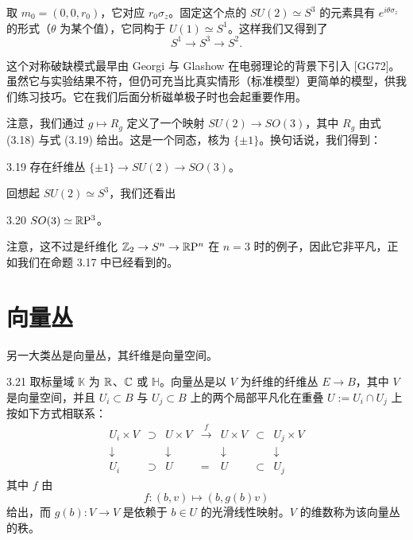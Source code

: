 取 $m_0=(0,0,r_0)$，它对应 $r_0\sigma_z$。固定这个点的 $SU(2)\simeq S^3$ 的元素具有 $e^{i\theta\sigma_z}$ 的形式（$\theta$ 为某个值），它同构于 $U(1)\simeq S^1$。这样我们又得到了
\[
S^1\to S^3\to S^2.
\tag{3.20}
\]

这个对称破缺模式最早由 Georgi 与 Glashow 在电弱理论的背景下引入 [GG72]。虽然它与实验结果不符，但仍可充当比真实情形（标准模型）更简单的模型，供我们练习技巧。它在我们后面分析磁单极子时也会起重要作用。

注意，我们通过 $g\mapsto R_g$ 定义了一个映射 $SU(2)\to SO(3)$，其中 $R_g$ 由式 (3.18) 与式 (3.19) 给出。这是一个同态，核为 $\{\pm1\}$。换句话说，我们得到：

\begin{example}{3.19}
存在纤维丛 $\{\pm1\}\to SU(2)\to SO(3)$。
\end{example}

回想起 $SU(2)\simeq S^3$，我们还看出

\begin{proposition}{3.20}
$SO(3)\simeq\mathbb{R}\mathrm{P}^3$。
\end{proposition}

注意，这不过是纤维化 $\mathbb{Z}_2\to S^n\to\mathbb{R}\mathrm{P}^n$ 在 $n=3$ 时的例子，因此它非平凡，正如我们在命题 3.17 中已经看到的。


\section{向量丛}

另一大类丛是向量丛，其纤维是向量空间。

\begin{definition}{3.21}
取标量域 $\mathbb{K}$ 为 $\mathbb{R}$、$\mathbb{C}$ 或 $\mathbb{H}$。向量丛是以 $V$ 为纤维的纤维丛 $E\to B$，其中 $V$ 是向量空间，并且 $U_i\subset B$ 与 $U_j\subset B$ 上的两个局部平凡化在重叠 $U:=U_i\cap U_j$ 上按如下方式相联系：
{\small\setlength{\arraycolsep}{4pt}
\[
\begin{array}{ccccccc}
U_i\times V & \supset & U\times V & \xrightarrow{\ f\ } & U\times V & \subset & U_j\times V\\[3pt]
\downarrow & & \downarrow & & \downarrow & & \downarrow\\[3pt]
U_i & \supset & U & = & U & \subset & U_j
\end{array}
\tag{3.21}
\]
}
其中 $f$ 由
\[
f:(b,v)\mapsto(b,g(b)v)
\tag{3.22}
\]
给出，而 $g(b):V\to V$ 是依赖于 $b\in U$ 的光滑线性映射。$V$ 的维数称为该向量丛的秩。
\end{definition}

